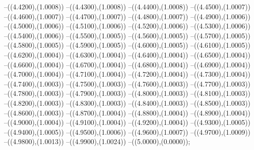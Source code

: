 {	--({\sx*(4.4200)},{\sy*(1.0008)})
	--({\sx*(4.4300)},{\sy*(1.0008)})
	--({\sx*(4.4400)},{\sy*(1.0008)})
	--({\sx*(4.4500)},{\sy*(1.0007)})
	--({\sx*(4.4600)},{\sy*(1.0007)})
	--({\sx*(4.4700)},{\sy*(1.0007)})
	--({\sx*(4.4800)},{\sy*(1.0007)})
	--({\sx*(4.4900)},{\sy*(1.0006)})
	--({\sx*(4.5000)},{\sy*(1.0006)})
	--({\sx*(4.5100)},{\sy*(1.0006)})
	--({\sx*(4.5200)},{\sy*(1.0006)})
	--({\sx*(4.5300)},{\sy*(1.0006)})
	--({\sx*(4.5400)},{\sy*(1.0006)})
	--({\sx*(4.5500)},{\sy*(1.0005)})
	--({\sx*(4.5600)},{\sy*(1.0005)})
	--({\sx*(4.5700)},{\sy*(1.0005)})
	--({\sx*(4.5800)},{\sy*(1.0005)})
	--({\sx*(4.5900)},{\sy*(1.0005)})
	--({\sx*(4.6000)},{\sy*(1.0005)})
	--({\sx*(4.6100)},{\sy*(1.0005)})
	--({\sx*(4.6200)},{\sy*(1.0004)})
	--({\sx*(4.6300)},{\sy*(1.0004)})
	--({\sx*(4.6400)},{\sy*(1.0004)})
	--({\sx*(4.6500)},{\sy*(1.0004)})
	--({\sx*(4.6600)},{\sy*(1.0004)})
	--({\sx*(4.6700)},{\sy*(1.0004)})
	--({\sx*(4.6800)},{\sy*(1.0004)})
	--({\sx*(4.6900)},{\sy*(1.0004)})
	--({\sx*(4.7000)},{\sy*(1.0004)})
	--({\sx*(4.7100)},{\sy*(1.0004)})
	--({\sx*(4.7200)},{\sy*(1.0004)})
	--({\sx*(4.7300)},{\sy*(1.0004)})
	--({\sx*(4.7400)},{\sy*(1.0003)})
	--({\sx*(4.7500)},{\sy*(1.0003)})
	--({\sx*(4.7600)},{\sy*(1.0003)})
	--({\sx*(4.7700)},{\sy*(1.0003)})
	--({\sx*(4.7800)},{\sy*(1.0003)})
	--({\sx*(4.7900)},{\sy*(1.0003)})
	--({\sx*(4.8000)},{\sy*(1.0003)})
	--({\sx*(4.8100)},{\sy*(1.0003)})
	--({\sx*(4.8200)},{\sy*(1.0003)})
	--({\sx*(4.8300)},{\sy*(1.0003)})
	--({\sx*(4.8400)},{\sy*(1.0003)})
	--({\sx*(4.8500)},{\sy*(1.0003)})
	--({\sx*(4.8600)},{\sy*(1.0003)})
	--({\sx*(4.8700)},{\sy*(1.0004)})
	--({\sx*(4.8800)},{\sy*(1.0004)})
	--({\sx*(4.8900)},{\sy*(1.0004)})
	--({\sx*(4.9000)},{\sy*(1.0004)})
	--({\sx*(4.9100)},{\sy*(1.0004)})
	--({\sx*(4.9200)},{\sy*(1.0004)})
	--({\sx*(4.9300)},{\sy*(1.0005)})
	--({\sx*(4.9400)},{\sy*(1.0005)})
	--({\sx*(4.9500)},{\sy*(1.0006)})
	--({\sx*(4.9600)},{\sy*(1.0007)})
	--({\sx*(4.9700)},{\sy*(1.0009)})
	--({\sx*(4.9800)},{\sy*(1.0013)})
	--({\sx*(4.9900)},{\sy*(1.0024)})
	--({\sx*(5.0000)},{\sy*(0.0000)});
}
\def\xwerteb{
\fill[color=red] (0.0000,0) circle[radius={0.07/\skala}];
\fill[color=white] (0.0000,0) circle[radius={0.05/\skala}];
\fill[color=red] (0.7322,0) circle[radius={0.07/\skala}];
\fill[color=white] (0.7322,0) circle[radius={0.05/\skala}];
\fill[color=red] (2.5000,0) circle[radius={0.07/\skala}];
\fill[color=white] (2.5000,0) circle[radius={0.05/\skala}];
\fill[color=red] (4.2678,0) circle[radius={0.07/\skala}];
\fill[color=white] (4.2678,0) circle[radius={0.05/\skala}];
\fill[color=red] (5.0000,0) circle[radius={0.07/\skala}];
\fill[color=white] (5.0000,0) circle[radius={0.05/\skala}];
}
